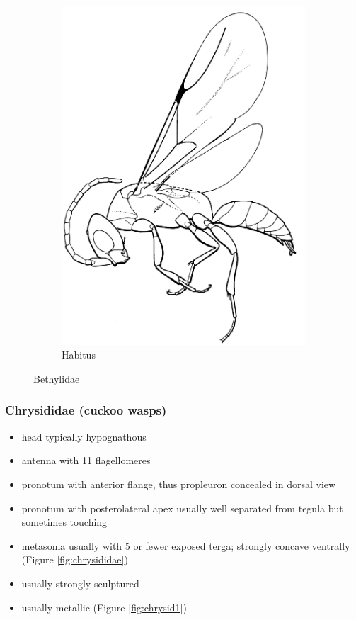 \documentclass[letterpaper, 11pt]{article}
\begin{document}
\begin{figure}[ht!]
\begin{subfigure}[ht!]{0.35\textwidth}
    \includegraphics[width=\textwidth]{BethylidHabitus}
  \caption{Habitus \citep[][Fig. 37]{goulet1993hymenoptera}}
  \label{fig:bethylid2}
\end{subfigure}
    \caption{Bethylidae}\label{fig:bethylids}
\end{figure}

\subsubsection{Chrysididae (cuckoo wasps)}
\begin{itemize}
\item head typically hypognathous 
\item antenna with 11 flagellomeres
\item pronotum with anterior flange, thus propleuron concealed in dorsal view 
\item pronotum with posterolateral apex usually well separated from tegula but sometimes touching 
\item metasoma usually with 5 or fewer exposed terga; strongly concave ventrally (Figure \ref{fig:chrysididae})
\item usually strongly sculptured  
\item usually metallic (Figure \ref{fig:chrysid1})
\end{itemize}
\end{document}
